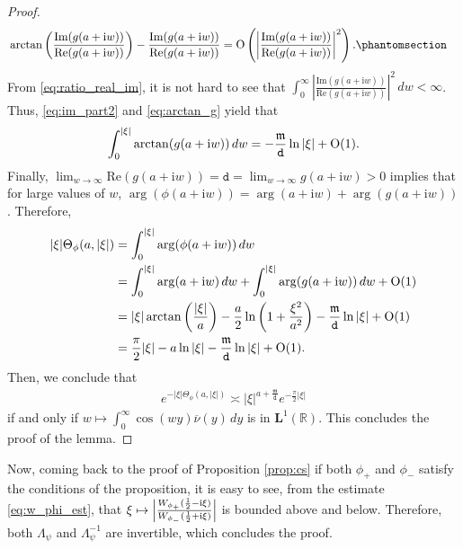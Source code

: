 \documentclass[12pt]{amsart}
\newcommand{\hlabel}{\phantomsection\label}
\numberwithin{equation}{section}
\newcommand{\bb}{\mathbb}
\renewcommand{\Re}{\textrm{Re}}
\renewcommand{\Im}{\textrm{Im}}
\newcommand{\ttt}{\mathtt}
\newcommand{\bmrm}[2][2]{\mathbf{#2}^{#1}}
\newcommand{\m}{\mathfrak{m}}
\theoremstyle{definition}
\theoremstyle{assump}
\theoremstyle{remark}
\begin{document}
{\begin{proof}
\begin{align}
&\arctan\left(\frac{\Im(g(a+\mathrm{i}w))}{\Re(g(a+\mathrm{i}w))}\right)-\frac{\Im(g(a+\mathrm{i}w))}{\Re(g(a+\mathrm{i}w))}={\rm{O}}\left(\left|\frac{\Im(g(a+\mathrm{i}w))}{\Re(g(a+\mathrm{i}w))}\right|^2\right).\hlabel{eq:arctan_g}
\end{align}
From \eqref{eq:ratio_real_im}, it is not hard to see that $\int_0^\infty\left|\frac{\Im(g(a+\mathrm{i}w))}{\Re(g(a+\mathrm{i}w))}\right|^2\,dw<\infty$. Thus, \eqref{eq:im_part2} and \eqref{eq:arctan_g} yield that
\begin{align*}
\int_0^{|\xi|}\arctan(g(a+\mathrm{i}w))\,dw=-\frac{\m}{\ttt{d}}\ln |\xi|+{\rm{O}}(1).
\end{align*}
Finally, $\lim_{w\to\infty}\Re(g(a+\mathrm{i}w))=\ttt{d}=\lim_{w\to\infty} g(a+\mathrm{i}w)>0$ implies that for large values of $w$, $\arg(\phi(a+\mathrm{i}w))=\arg(a+\mathrm{i}w)+\arg(g(a+\mathrm{i}w))$. Therefore,
\begin{align*}
|\xi|\Theta_\phi(a,|\xi|)&=\int_0^{|\xi|}\arg(\phi(a+\mathrm{i}w))\,dw \\
&=\int_0^{|\xi|}\arg(a+\mathrm{i}w)\,dw+\int_0^{|\xi|}\arg(g(a+\mathrm{i}w))\,dw+{\rm{O}}(1) \\
&=|\xi|\arctan\left(\frac{|\xi|}{a}\right)-\frac{a}{2}\ln\left(1+\frac{\xi^2}{a^2}\right)-\frac{\m}{\ttt{d}}\ln |\xi|+{\rm{O}}(1) \\
&=\frac{\pi}{2}|\xi|-a\ln |\xi|-\frac{\m}{\ttt{d}}\ln |\xi| +{\rm{O}}(1).
\end{align*}
Then, we conclude that
\begin{align*}
e^{-|\xi|\Theta_\phi(a,|\xi|)}\asymp |\xi|^{a+\frac{\m}{\ttt{d}}} e^{-\frac{\pi}{2}|\xi|}
\end{align*}
if and only if $w\mapsto\int_0^\infty\cos(wy)\overline{\nu}(y)\,dy$ is in $\bmrm[1]{L}(\bb{R})$.
This concludes the proof of the lemma.
\end{proof}
Now, coming back to the proof of  Proposition  \ref{prop:cs} if both $\phi_+$ and $\phi_-$ satisfy the conditions of the proposition, it is easy to see, from the estimate \eqref{eq:w_phi_est}, that $\xi \mapsto \left| \frac{W_{\phi_+}(\frac{1}{2}-{\rm{i}}\xi   )}{W_{\phi_-}(\frac{1}{2}+\mathrm{i}\xi)}\right|$ is bounded above and below. Therefore, both $\Lambda_\psi$ and $\Lambda^{-1}_\psi$ are invertible, which concludes the proof.

}
\end{document}

